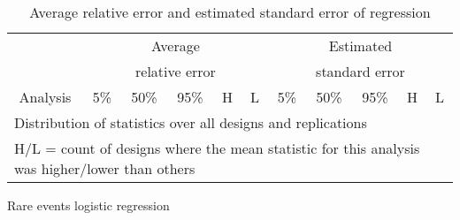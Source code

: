 \documentclass[a4paper,10pt]{article}
\begin{document}
\begin{table}[ht]
\begin{center}
\caption{Average relative error and estimated standard error of regression}
\begin{tabular}{lrrrrrrrrrr}
\toprule
&\multicolumn{5}{c}{Average}&\multicolumn{5}{c}{Estimated} \\
&\multicolumn{5}{c}{relative error}&\multicolumn{5}{c}{standard error} \\
\cmidrule(l{.75em}){2-6}\cmidrule(l{.75em}){7-11}
\multicolumn{1}{c}{Analysis}&\multicolumn{1}{c}{5\%}&\multicolumn{1}{c}{50\%}&\multicolumn{1}{c}{95\%}&\multicolumn{1}{c}{H}&\multicolumn{1}{c}{L}&\multicolumn{1}{c}{5\%}&\multicolumn{1}{c}{50\%}&\multicolumn{1}{c}{95\%}&\multicolumn{1}{c}{H}&\multicolumn{1}{c}{L} \\
\midrule

\bottomrule
\multicolumn{11}{l}{\footnotesize{Distribution of statistics over all designs and replications}} \\
\multicolumn{11}{l}{\footnotesize{H/L = count of designs where the mean statistic for this analysis was higher/lower than others}} \\
\end{tabular}
\end{center}
\end{table}

\begin{table}[ht]
\begin{center}
\caption{Rare events logistic regression}

\end{center}
\end{table}
\end{document}
